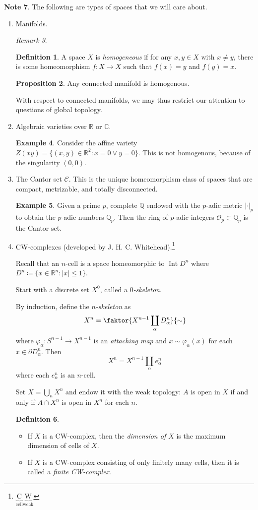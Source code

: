 \documentclass[10pt,letterpaper,cm]{nupset}
\theoremstyle{definition}
\newtheorem{definition}{Definition}[subsection]
\newtheorem{exmp}[definition]{Example}
\newtheorem{note}[definition]{Note}
\theoremstyle{theorem}
\newtheorem{prop}[definition]{Proposition}
\theoremstyle{remark}
\newtheorem{remark}[definition]{Remark}
\newcommand{\C}{\mathbb C}
\newcommand{\Q}{\mathbb Q}
\newcommand{\R}{\mathbb{R}}
\newcommand{\1}{\mathbb{1}}
\newcommand{\0}{\vec 0}
\DeclareMathOperator{\Int}{Int}
\begin{document}
\begin{note}
The following are types of spaces that we will care about.
\begin{enumerate}
\item Manifolds.
\begin{remark}
\begin{definition}
A space $X$ is \textit{homogeneous} if for any $x,y \in X$ with $x\ne y$, there is some homeomorphism $f: X \to X$ such that $f(x)= y$ and $f(y) =x$.
\end{definition}
\begin{prop}
Any connected manifold is homogenous. 
\end{prop}
With respect to connected manifolds, we may thus restrict our attention to questions of global topology.
\end{remark}
\item Algebraic varieties over $\R$ or $\C$.
\begin{exmp}
Consider the affine variety $Z(xy) =\{(x, y) \in \R^2 : x=0 \lor y=0\}$. This is not homogenous, because of the singularity $(0,0)$.  
\end{exmp}
\item The Cantor set $\mathcal{C}$. This is the unique homeomorphism class of spaces that are compact, metrizable, and totally disconnected. 
\begin{exmp}
Given a prime $p$, complete $\Q$ endowed with the $p$-adic metric $|\cdot|_p$ to obtain the $p$-adic numbers $\Q_p$. Then the ring of $p$-adic integers $\mathcal{O}_p \subset \Q_p$ is the Cantor set.
\end{exmp}
\item CW-complexes (developed by J. H. C. Whitehead).\footnote{$ \underbrace{\text{C}}_{\text{cell}}\underbrace{\text{W}}_{\text{weak}} $} 

Recall that an $n$-cell is a space homeomorphic to $\Int{D^n}$ where $D^n \coloneqq  \{x \in \R^n : |x| \leq 1\}$.

Start with a discrete set $X^0$, called a \textit{$0$-skeleton}. 

By induction, define the \textit{$n$-skeleton} as $$X^n = \faktor{X^{n-1} \coprod_{\alpha} D^n_{\alpha}}{\sim}$$ where $\varphi_{\alpha}: S^{n-1} \to X^{n-1}$ is an \textit{attaching map} and $x\sim \varphi_{\alpha}(x)$ for each $x\in \partial{D^n_{\alpha}}$. Then $$X^n = X^{n-1} \coprod_{\alpha} e^n_{\alpha}$$ where each $e^n_{\alpha}$ is an $n$-cell.

Set $X= \bigcup_{n} X^n$ and endow it with the weak topology: $A$ is open in $X$ if and only if $A\cap X^n$ is open in $X^n$ for each $n$.
\begin{definition} $ $
\begin{itemize}
\item If $X$ is a CW-complex, then the \textit{dimension of $X$} is the maximum dimension of cells of $X$.
\item If $X$ is a CW-complex consisting of only finitely many cells, then it is called a \textit{finite CW-complex}.
\end{itemize}
\end{definition}
\end{enumerate}
\end{note}
\end{document}
